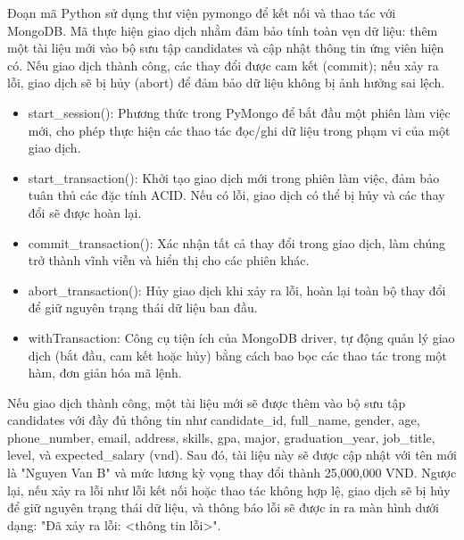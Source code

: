 Đoạn mã Python sử dụng thư viện pymongo để kết nối và thao tác với MongoDB. Mã thực hiện giao dịch nhằm đảm bảo tính toàn vẹn dữ liệu: thêm một tài liệu mới vào bộ sưu tập candidates và cập nhật thông tin ứng viên hiện có. Nếu giao dịch thành công, các thay đổi được cam kết (commit); nếu xảy ra lỗi, giao dịch sẽ bị hủy (abort) để đảm bảo dữ liệu không bị ảnh hưởng sai lệch.
\begin{itemize}
    \item start\_session(): Phương thức trong PyMongo để bắt đầu một phiên làm việc mới, cho phép thực hiện các thao tác đọc/ghi dữ liệu trong phạm vi của một giao dịch.
    \item start\_transaction(): Khởi tạo giao dịch mới trong phiên làm việc, đảm bảo tuân thủ các đặc tính ACID. Nếu có lỗi, giao dịch có thể bị hủy và các thay đổi sẽ được hoàn lại.
    \item commit\_transaction(): Xác nhận tất cả thay đổi trong giao dịch, làm chúng trở thành vĩnh viễn và hiển thị cho các phiên khác.
    \item abort\_transaction(): Hủy giao dịch khi xảy ra lỗi, hoàn lại toàn bộ thay đổi để giữ nguyên trạng thái dữ liệu ban đầu.
    \item withTransaction: Công cụ tiện ích của MongoDB driver, tự động quản lý giao dịch (bắt đầu, cam kết hoặc hủy) bằng cách bao bọc các thao tác trong một hàm, đơn giản hóa mã lệnh.
\end{itemize}


Nếu giao dịch thành công, một tài liệu mới sẽ được thêm vào bộ sưu tập candidates với đầy đủ thông tin như candidate\_id, full\_name, gender, age, phone\_number, email, address, skills, gpa, major, graduation\_year, job\_title, level, và expected\_salary (vnd). Sau đó, tài liệu này sẽ được cập nhật với tên mới là "Nguyen Van B" và mức lương kỳ vọng thay đổi thành 25,000,000 VND. Ngược lại, nếu xảy ra lỗi như lỗi kết nối hoặc thao tác không hợp lệ, giao dịch sẽ bị hủy để giữ nguyên trạng thái dữ liệu, và thông báo lỗi sẽ được in ra màn hình dưới dạng: "Đã xảy ra lỗi: <thông tin lỗi>".
